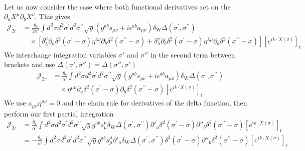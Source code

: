 \begin{tcolorbox}[breakable]
\begin{align}
		\end{align}
		Let us now consider the case where both functional derivatives act on the $\partial_a X^\mu \partial_b X^\nu$. This gives
		\begin{align}
			\mathcal{J}_{2 c} &= \frac{g_c}{2 \alpha'} \int d^2 \sigma d^2 \sigma^{\prime} d^2 \sigma^{\prime \prime} \sqrt{g}\left(g^{a b} s_{\mu \nu}+i \epsilon^{a b} a_{\mu \nu}\right) \delta_{\mathrm{W}} \Delta\left(\sigma^{\prime}, \sigma^{\prime \prime}\right) \nonumber \\
			&\quad \times\left[\delta_\lambda^\mu \partial_a \delta^2\left(\sigma^{\prime}-\sigma\right) \eta^{\lambda \nu} \partial_b \delta^2\left(\sigma^{\prime \prime}-\sigma\right) + \delta_\lambda^\nu \partial_b \delta^2\left(\sigma^{\prime}-\sigma\right) \eta^{\lambda \mu} \partial_a \delta^2\left(\sigma^{\prime \prime}-\sigma\right)\right]\left[e^{i k \cdot X(\sigma)}\right]_{\mathrm{r}}
		\end{align}
		We interchange integration variables $\sigma'$ and $\sigma''$ in the second term between brackets and use $\Delta\left(\sigma', \sigma''\right)=\Delta\left(\sigma'', \sigma'\right)$
		\begin{align}
			\mathcal{J}_{2 c} &= \frac{g_c}{\alpha'} \int d^2 \sigma d^2 \sigma^{\prime} d^2 \sigma^{\prime \prime} \sqrt{g}\left(g^{a b} s_{\mu \nu}+i \epsilon^{a b} a_{\mu \nu}\right) \delta_{\mathrm{W}} \Delta\left(\sigma^{\prime}, \sigma^{\prime \prime}\right) \nonumber \\
			&\quad \times \eta^{\mu \nu} \partial_a \delta^2\left(\sigma^{\prime}-\sigma\right) \partial_b \delta^2\left(\sigma^{\prime \prime}-\sigma\right)\left[e^{i k \cdot X(\sigma)}\right]_{\mathrm{r}}
		\end{align}
		We use $a_{\mu \nu} \eta^{\mu \nu}=0$ and the chain rule for derivatives of the delta function, then perform our first partial integration
		\begin{align}
			\mathcal{J}_{2 c} &= \frac{g_c}{\alpha'} \int d^2 \sigma d^2 \sigma^{\prime} d^2 \sigma^{\prime \prime} \sqrt{g} g^{a b} s_\mu^\mu \delta_{\mathrm{W}} \Delta\left(\sigma^{\prime}, \sigma^{\prime \prime}\right) \partial'_a \delta^2\left(\sigma^{\prime}-\sigma\right) \partial''_b \delta^2\left(\sigma^{\prime \prime}-\sigma\right)\left[e^{i k \cdot X(\sigma)}\right]_{\mathrm{r}} \nonumber \\
			&= -\frac{g_c}{\alpha'} \int d^2 \sigma d^2 \sigma^{\prime} d^2 \sigma^{\prime \prime} \sqrt{g} g^{a b} s_\mu^\mu \partial'_a \delta_{\mathrm{W}} \Delta\left(\sigma^{\prime}, \sigma^{\prime \prime}\right) \delta^2\left(\sigma^{\prime}-\sigma\right) \partial''_b \delta^2\left(\sigma^{\prime \prime}-\sigma\right)\left[e^{i k \cdot X(\sigma)}\right]_{\mathrm{r}} \nonumber \\

\end{align}
\end{tcolorbox}
